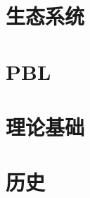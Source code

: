 \documentclass[UTF8,oneside]{ctexbook}
\begin{document}



\part{生态系统}





%
%
%

\part{PBL}




\part{理论基础}











% 









\part{历史}










% 
\end{document}
